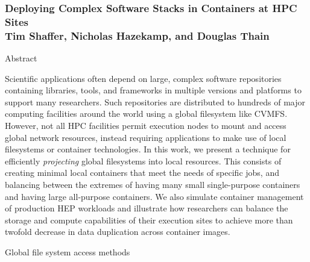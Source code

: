 \documentclass{beamer}
\newenvironment{BlueBlock}[1]
{\begin{alertblock}{#1\rule{0pt}{2.3ex}} \vspace*{16pt}}
{\end{alertblock}}
\begin{document}
\begin{frame}[fragile]
\frametitle{
  {\fontsize{60pt}{60pt}\selectfont
  \textbf{Deploying Complex Software Stacks in Containers at HPC Sites}} \\ \vspace{32pt}
  {\fontsize{48pt}{48pt}\selectfont
  Tim Shaffer, Nicholas Hazekamp, and Douglas Thain}
}

\begin{minipage}[t][0.93\textheight]{0.32\textwidth}

\begin{BlueBlock}{Abstract}
\parbox{\linewidth}{
Scientific applications often depend on large,
complex software repositories containing libraries, tools,
and frameworks in multiple versions and platforms to support many researchers.
Such repositories are distributed to hundreds of major computing facilities around the world using a global filesystem like CVMFS.
However, not all HPC facilities permit execution nodes to mount and access global network resources,
instead requiring applications to make use of local filesystems or container technologies.
In this work, we present a technique for efficiently \emph{projecting} global filesystems into local resources.
This consists of creating minimal local containers that meet the needs of specific jobs,
and balancing between the extremes of having many small single-purpose containers and having large all-purpose containers.
We also simulate container management of production HEP workloads and illustrate how researchers can balance the storage and compute capabilities of their execution sites to achieve more than twofold decrease in data duplication across container images.
}
\end{BlueBlock}

\vfill

\begin{BlueBlock}{Global file system access methods}
\parbox{0.6\linewidth}{
}
\hfill
\parbox{0.35\linewidth}{
\vspace*{1.5ex}

}
\end{BlueBlock}
\end{minipage}
\end{frame}
\end{document}
